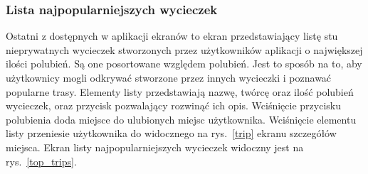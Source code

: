         \subsubsection{Lista najpopularniejszych wycieczek}
        Ostatni z dostępnych w aplikacji ekranów to ekran przedstawiający listę stu nieprywatnych wycieczek stworzonych przez użytkowników aplikacji o największej ilości polubień. 
        Są one posortowane względem polubień. Jest to sposób na to, aby użytkownicy mogli odkrywać stworzone przez innych wycieczki i poznawać popularne trasy. Elementy 
        listy przedstawiają nazwę, twórcę oraz ilość polubień wycieczek, oraz przycisk pozwalający rozwinąć ich opis. Wciśnięcie przycisku polubienia doda miejsce do ulubionych miejsc
        użytkownika. Wciśnięcie elementu listy przeniesie użytkownika do widocznego na rys.~\ref{trip} ekranu szczegółów miejsca. Ekran listy najpopularniejszych wycieczek widoczny jest 
        na rys.~\ref{top_trips}.


